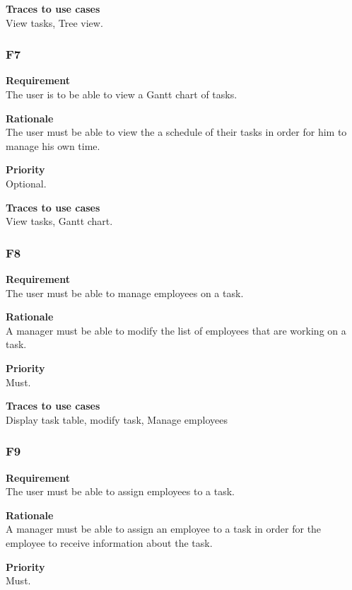 \documentclass[12pt]{article}
\begin{document}
\noindent
{\bf Traces to use cases}\\
View tasks, Tree view.

\subsubsection{F7} \label{uc:7}

\noindent
{\bf Requirement}\\
The user is to be able to view a Gantt chart of tasks.

\noindent
{\bf Rationale}\\
The user must be able to view the a schedule of their tasks in order for him to manage his own time.

\noindent
{\bf Priority}\\
Optional.

\noindent
{\bf Traces to use cases}\\
View tasks, Gantt chart.

\subsubsection{F8} \label{uc:8}

\noindent
{\bf Requirement}\\
The user must be able to manage employees on a task.

\noindent
{\bf Rationale}\\
A manager must be able to modify the list of employees that are working on a task.

\noindent
{\bf Priority}\\
Must.

\noindent
{\bf Traces to use cases}\\
Display task table, modify task, Manage employees

\subsubsection{F9} \label{uc:9}

\noindent
{\bf Requirement}\\
The user must be able to assign employees to a task.

\noindent
{\bf Rationale}\\
A manager must be able to assign an employee to a task in order for the employee to receive information about the task.

\noindent
{\bf Priority}\\
Must.
\end{document}
